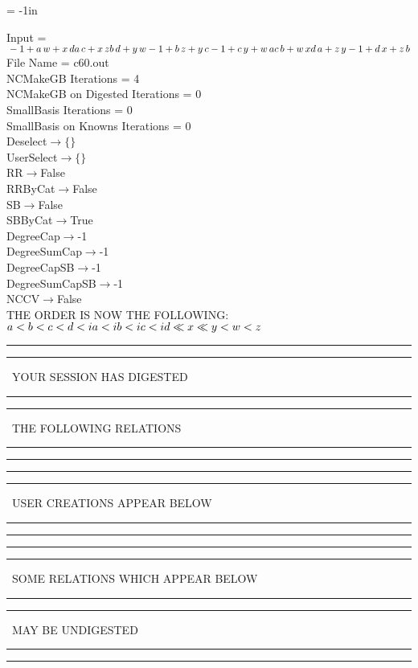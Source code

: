 \voffset = -1in
\evensidemargin 0.1in
\oddsidemargin 0.1in
\textheight 9in
\textwidth 6in

\normalsize
\baselineskip=12pt
\noindent
Input = 
$
\\-1 + a\,
 w + x\,
 d\\
a\,
 c + x\,
 z\\
b\,
 d + y\,
 w\\
-1 + b\,
 z + y\,
 c\\
-1 + c\,
 y + w\,
 a\\
c\,
 b + w\,
 x\\
d\,
 a + z\,
 y\\
-1 + d\,
 x + z\,
 b\\
$
File Name = c60.out\\
NCMakeGB Iterations = 4\\
NCMakeGB on Digested Iterations = 0\\
SmallBasis Iterations = 0\\
SmallBasis on Knowns Iterations = 0\\
Deselect$\rightarrow \{\}$\\
UserSelect$\rightarrow \{\}$\\
RR$\rightarrow $False\\
RRByCat$\rightarrow $False\\
SB$\rightarrow $False\\
SBByCat$\rightarrow $True\\
DegreeCap$\rightarrow $-1\\
DegreeSumCap$\rightarrow $-1\\
DegreeCapSB$\rightarrow $-1\\
DegreeSumCapSB$\rightarrow $-1\\
NCCV$\rightarrow $False\\
THE ORDER IS NOW THE FOLLOWING:\hfil\break
$
a<b<c<d<ia<ib<ic<id\ll
x\ll
y<w<z\\
$
\rule[2pt]{6in}{4pt}\hfil\break
\rule[2pt]{1.879in}{4pt}
\ YOUR SESSION HAS DIGESTED\ 
\rule[2pt]{1.879in}{4pt}\hfil\break
\rule[2pt]{1.923in}{4pt}
\ THE FOLLOWING RELATIONS\ 
\rule[2pt]{1.923in}{4pt}\hfil\break
\rule[2pt]{6in}{4pt}\hfil\break
\rule[2pt]{6in}{1pt}\hfil\break
\rule[2.5pt]{1.701in}{1pt}
\ USER CREATIONS APPEAR BELOW\ 
\rule[2.5pt]{1.701in}{1pt}\hfil\break
\rule[2pt]{6in}{1pt}\hfil\break
\rule[2pt]{6in}{4pt}\hfil\break
\rule[2pt]{1.45in}{4pt}
\ SOME RELATIONS WHICH APPEAR BELOW\ 
\rule[2pt]{1.45in}{4pt}\hfil\break
\rule[2pt]{2.18in}{4pt}
\ MAY BE UNDIGESTED\ 
\rule[2pt]{2.18in}{4pt}\hfil\break
\rule[2pt]{6in}{4pt}\hfil\break
